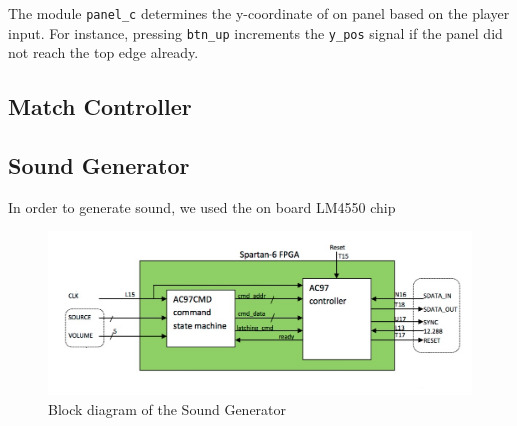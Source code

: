 		The module \texttt{panel\_c} determines the y-coordinate of on panel based on the player input. For instance, pressing \texttt{btn\_up} increments the \texttt{y\_pos} signal if the panel did not reach the top edge already. 


    \subsection{Match Controller}
    \subsection{Sound Generator}
        In order to generate sound, we used the on board LM4550 chip
	\begin{figure}[here]
		\centering
		\includegraphics[scale=0.5]{images/snd_gen.jpg}
		\caption{Block diagram of the Sound Generator}
		\label{snd_gen}
	\end{figure}
